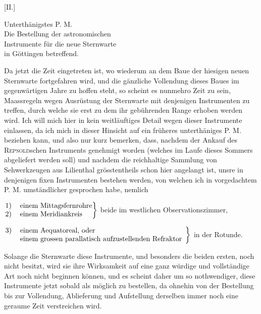 \clearpage\begingroup
\hypertarget{native-307-lower}{}
\begin{center}[II.]\end{center}
\noindent\hspace*{\parindent}Unterthänigstes P. M.\\
Die Bestellung der astronomischen\\
Instrumente für die neue Sternwarte\\
in Göttingen betreffend.

Da jetzt die Zeit eingetreten ist, wo wiederum an dem Baue der hiesigen neuen Sternwarte fortgefahren wird, und die gänzliche Vollendung dieses Baues im gegenwärtigen Jahre zu hoffen steht, so scheint es nunmehro Zeit zu sein, Maassregeln wegen Ausrüstung der Sternwarte mit denjenigen Instrumenten zu treffen, durch welche sie erst zu dem ihr gebührenden Range erhoben werden wird. Ich will mich hier in kein weitläuftiges Detail wegen dieser
\clearpage{}
\noindent Instrumente einlassen, da ich mich in dieser Hinsicht auf ein früheres unterthäniges P. M. beziehen kann, und also nur kurz bemerken, dass, nachdem der Ankauf des \textsc{Repsold}schen Instruments genehmigt worden (welches im Laufe dieses Sommers abgeliefert werden soll) und nachdem die reichhaltige Sammlung von Sehwerkzeugen aus Lilienthal grösstentheils schon hier angelangt ist, unsre  in denjenigen fixen Instrumenten bestehen werden, von welchen ich in vorgedachtem P. M. umständlicher gesprochen habe, nemlich
\begin{center}
\(\left.\begin{tabular}{@{}rl@{}}1)&einem Mittagsfernrohre\\2)&einem Meridiankreis\end{tabular}\right\}\) beide im westlichen Observationszimmer,\par\smallskip
\(\left.\begin{tabular}{@{}rp{.68\textwidth}@{}}3)&einem Aequatoreal, oder\\&einem grossen parallatisch aufzustellenden Refraktor\end{tabular}\right\}\) in der Rotunde.
\end{center}

Solange die Sternwarte diese Instrumente, und besonders die beiden ersten, noch nicht besitzt, wird sie ihre Wirksamkeit auf eine ganz würdige und vollständige Art noch nicht beginnen können, und es scheint daher um so nothwendiger, diese Instrumente jetzt sobald als möglich zu bestellen, da ohnehin von der Bestellung bis zur Vollendung, Ablieferung und Aufstellung derselben immer noch eine geraume Zeit verstreichen wird.

